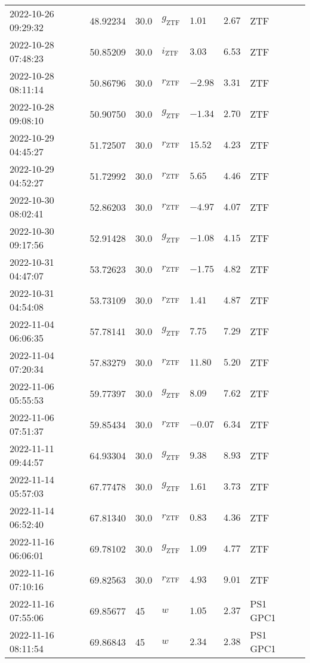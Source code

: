 \documentclass{nature_plusfigure}
\begin{document}
\begin{supplement}
\begin{center}
\begin{longtable}{llllllll}
2022-10-26 09:29:32 & 48.92234 & 30.0 & ${g}_\mathrm{ZTF}$ & $1.01$ & $2.67$ & ZTF &  \\ 
2022-10-28 07:48:23 & 50.85209 & 30.0 & ${i}_\mathrm{ZTF}$ & $3.03$ & $6.53$ & ZTF &  \\ 
2022-10-28 08:11:14 & 50.86796 & 30.0 & ${r}_\mathrm{ZTF}$ & $-2.98$ & $3.31$ & ZTF &  \\ 
2022-10-28 09:08:10 & 50.90750 & 30.0 & ${g}_\mathrm{ZTF}$ & $-1.34$ & $2.70$ & ZTF &  \\ 
2022-10-29 04:45:27 & 51.72507 & 30.0 & ${r}_\mathrm{ZTF}$ & $15.52$ & $4.23$ & ZTF &  \\ 
2022-10-29 04:52:27 & 51.72992 & 30.0 & ${r}_\mathrm{ZTF}$ & $5.65$ & $4.46$ & ZTF &  \\ 
2022-10-30 08:02:41 & 52.86203 & 30.0 & ${r}_\mathrm{ZTF}$ & $-4.97$ & $4.07$ & ZTF &  \\ 
2022-10-30 09:17:56 & 52.91428 & 30.0 & ${g}_\mathrm{ZTF}$ & $-1.08$ & $4.15$ & ZTF &  \\ 
2022-10-31 04:47:07 & 53.72623 & 30.0 & ${r}_\mathrm{ZTF}$ & $-1.75$ & $4.82$ & ZTF &  \\ 
2022-10-31 04:54:08 & 53.73109 & 30.0 & ${r}_\mathrm{ZTF}$ & $1.41$ & $4.87$ & ZTF &  \\ 
2022-11-04 06:06:35 & 57.78141 & 30.0 & ${g}_\mathrm{ZTF}$ & $7.75$ & $7.29$ & ZTF &  \\ 
2022-11-04 07:20:34 & 57.83279 & 30.0 & ${r}_\mathrm{ZTF}$ & $11.80$ & $5.20$ & ZTF &  \\ 
2022-11-06 05:55:53 & 59.77397 & 30.0 & ${g}_\mathrm{ZTF}$ & $8.09$ & $7.62$ & ZTF &  \\ 
2022-11-06 07:51:37 & 59.85434 & 30.0 & ${r}_\mathrm{ZTF}$ & $-0.07$ & $6.34$ & ZTF &  \\ 
2022-11-11 09:44:57 & 64.93304 & 30.0 & ${g}_\mathrm{ZTF}$ & $9.38$ & $8.93$ & ZTF &  \\ 
2022-11-14 05:57:03 & 67.77478 & 30.0 & ${g}_\mathrm{ZTF}$ & $1.61$ & $3.73$ & ZTF &  \\ 
2022-11-14 06:52:40 & 67.81340 & 30.0 & ${r}_\mathrm{ZTF}$ & $0.83$ & $4.36$ & ZTF &  \\ 
2022-11-16 06:06:01 & 69.78102 & 30.0 & ${g}_\mathrm{ZTF}$ & $1.09$ & $4.77$ & ZTF &  \\ 
2022-11-16 07:10:16 & 69.82563 & 30.0 & ${r}_\mathrm{ZTF}$ & $4.93$ & $9.01$ & ZTF &  \\ 
2022-11-16 07:55:06 & 69.85677 & 45 & $w$ & $1.05$ & $2.37$ & PS1 GPC1 &  \\ 
2022-11-16 08:11:54 & 69.86843 & 45 & $w$ & $2.34$ & $2.38$ & PS1 GPC1 &  \\ 

\end{longtable}
\end{center}
\end{supplement}
\end{document}
